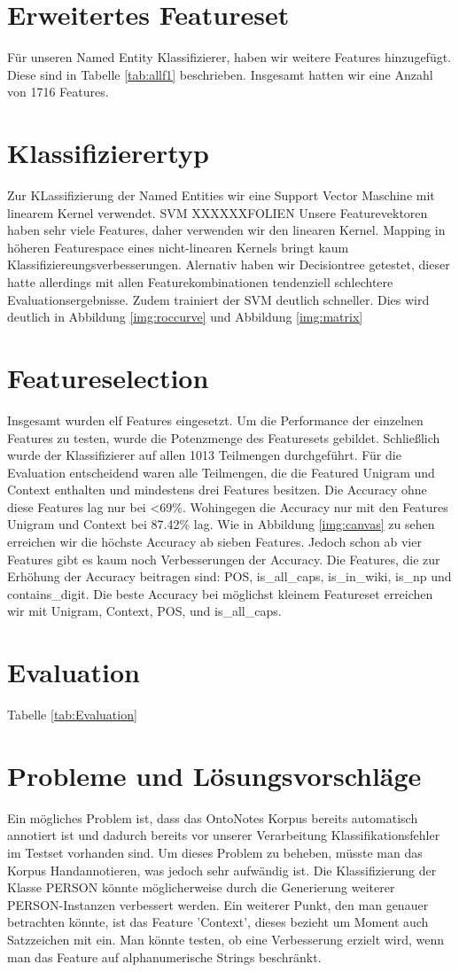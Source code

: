 \documentclass[a4paper, 11pt]{article}
\begin{document}
\section{Erweitertes Featureset}
Für unseren Named Entity Klassifizierer, haben wir weitere Features hinzugefügt. Diese sind in Tabelle \ref{tab:allf1} beschrieben. Insgesamt hatten wir eine Anzahl von 1716 Features.
\section{Klassifizierertyp}
Zur KLassifizierung der Named Entities wir eine Support Vector Maschine mit linearem Kernel verwendet. SVM XXXXXXFOLIEN
Unsere Featurevektoren haben sehr viele Features, daher verwenden wir den linearen Kernel. Mapping in höheren Featurespace eines nicht-linearen Kernels bringt kaum Klassifiziereungsverbesserungen. Alernativ haben wir Decisiontree getestet, dieser hatte allerdings mit allen Featurekombinationen tendenziell schlechtere Evaluationsergebnisse. Zudem trainiert der SVM deutlich schneller. Dies wird deutlich in Abbildung \ref{img:roccurve} und Abbildung \ref{img:matrix}
\section{Featureselection}
Insgesamt wurden elf Features eingesetzt. Um die Performance der einzelnen Features zu testen, wurde die Potenzmenge des Featuresets gebildet. Schließlich wurde der Klassifizierer auf allen 1013 Teilmengen durchgeführt. Für die Evaluation entscheidend waren alle Teilmengen, die die Featured Unigram und Context enthalten und mindestens drei Features besitzen. Die Accuracy ohne diese Features lag nur bei <69\%. Wohingegen die Accuracy nur mit den Features Unigram und Context bei 87.42\% lag. Wie in Abbildung \ref{img:canvas} zu sehen erreichen wir die höchste Accuracy ab sieben Features. Jedoch schon ab vier Features gibt es kaum noch Verbesserungen der Accuracy. Die Features, die zur Erhöhung der Accuracy beitragen sind: POS, is_all_caps, is_in_wiki, is_np und contains_digit. Die beste Accuracy bei möglichst kleinem Featureset erreichen wir mit Unigram, Context, POS, und is_all_caps.
\section{Evaluation}
Tabelle \ref{tab:Evaluation}
\section{Probleme und Lösungsvorschläge}
Ein mögliches Problem ist, dass das OntoNotes Korpus bereits automatisch annotiert ist und dadurch bereits vor unserer Verarbeitung Klassifikationsfehler im Testset vorhanden sind. Um dieses Problem zu beheben, müsste man das Korpus Handannotieren, was jedoch sehr aufwändig ist. Die Klassifizierung der Klasse PERSON könnte möglicherweise durch die Generierung weiterer PERSON-Instanzen verbessert werden. Ein weiterer Punkt, den man genauer betrachten könnte, ist das Feature 'Context', dieses bezieht um Moment auch Satzzeichen mit ein. Man könnte testen, ob eine Verbesserung erzielt wird, wenn man das Feature auf alphanumerische Strings beschränkt.
\end{document}
